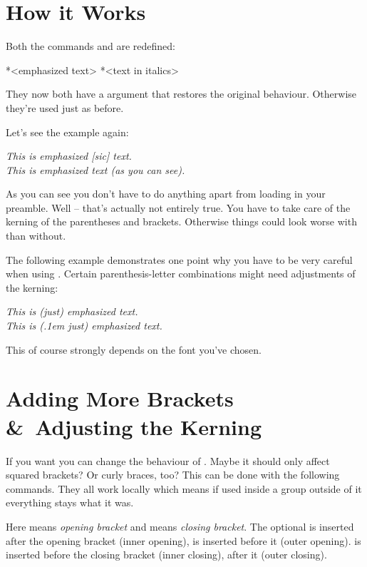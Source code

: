\documentclass[DIV10,toc=index,toc=bib]{cnpkgdoc}
\begin{document}
\section{How it Works}
Both the commands  and  are redefined:
\begin{beschreibung}
 *{<emphasized text>}
 *{<text in italics>}
\end{beschreibung}
They now both have a \code{*} argument that restores the original behaviour.
Otherwise they're used just as before.

Let's see the example again:
\begin{beispiel}
 \emph{This is emphasized [sic] text.} \\
 \emph{This is emphasized text (as you can see).}
\end{beispiel}
As you can see you don't have to do anything apart from loading \embrac in your
preamble. Well -- that's actually not entirely true. You have to take care of the
kerning of the parentheses and brackets. Otherwise things could look worse with
\embrac than without.

The following example demonstrates one point why you have to be very careful
when using \embrac. Certain parenthesis-letter combinations might need adjustments
of the kerning:
\begin{beispiel}
 \emph{This is (just) emphasized text.} \\
 \emph{This is (\kern.1em just) emphasized text.}
\end{beispiel}
This of course strongly depends on the font you've chosen.

\section{Adding More Brackets \&\ Adjusting the Kerning}
If you want you can change the behaviour of \embrac. Maybe it should only affect
squared brackets? Or curly braces, too? This can be done with the following
commands. They all work locally which means if used inside a group outside of it
everything stays what it was.
\begin{beschreibung}
\end{beschreibung}
Here  means \emph{opening bracket} and  means \emph{closing
bracket}. The optional  is inserted after the opening bracket
(inner opening),  is inserted before it (outer opening).
 is inserted before the closing bracket (inner closing),
 after it (outer closing).
\end{document}
